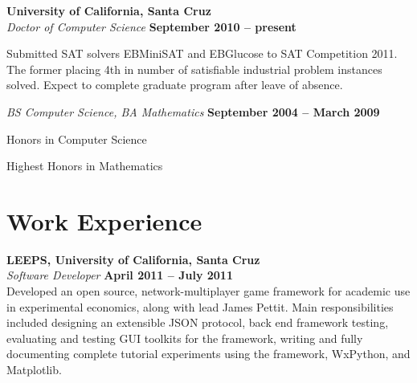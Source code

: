 \documentclass[margin,line]{resume}
\begin{document}
\begin{resume}
    \textbf{University of California, Santa Cruz} \vspace{2mm}\\\vspace{1mm}%
    \textsl{Doctor of Computer Science} \hfill \textbf{ September 2010 -- present}\vspace{-3mm}\\\vspace{-1mm}%
    \begin{mylist}
        \item Submitted SAT solvers EBMiniSAT and EBGlucose to SAT Competition 2011.
            The former placing 4th in number of satisfiable industrial problem instances solved.
            Expect to complete graduate program after leave of absence.
    \end{mylist}\vspace{-1.5mm}
    \textsl{BS Computer Science, BA Mathematics} \hfill \textbf{September 2004 -- March 2009}\vspace{-3mm}\\\vspace{-1mm}%
    \begin{mylist}
        \item Honors in Computer Science
        \item Highest Honors in Mathematics
    \end{mylist}

    \section{\mysidestyle Work Experience}

    \textbf{LEEPS, University of California, Santa Cruz} \vspace{2mm}\\\vspace{1mm}%
    \textsl{Software Developer} \hfill \textbf{April 2011 -- July 2011}\\
    Developed an open source, network-multiplayer game framework
    for academic use in experimental economics, along with lead
    James Pettit. Main responsibilities included designing an
    extensible JSON protocol, back end framework testing, evaluating
    and testing GUI toolkits for the framework, writing and fully
    documenting complete tutorial experiments using the framework,
    WxPython, and Matplotlib.


\end{resume}
\end{document}
